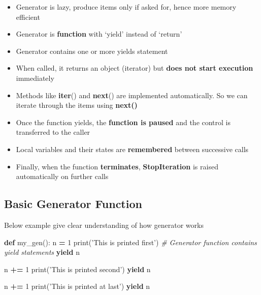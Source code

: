 \documentclass[
]{book}
\newenvironment{Shaded}{\begin{snugshade}}{\end{snugshade}}
\newcommand{\BuiltInTok}[1]{#1}
\newcommand{\CommentTok}[1]{\textcolor[rgb]{0.37,0.37,0.37}{\textit{#1}}}
\newcommand{\ControlFlowTok}[1]{\textcolor[rgb]{0.27,0.27,0.27}{\textbf{#1}}}
\newcommand{\DecValTok}[1]{\textcolor[rgb]{0.06,0.06,0.06}{#1}}
\newcommand{\KeywordTok}[1]{\textcolor[rgb]{0.27,0.27,0.27}{\textbf{#1}}}
\newcommand{\NormalTok}[1]{#1}
\newcommand{\OperatorTok}[1]{\textcolor[rgb]{0.43,0.43,0.43}{\textbf{#1}}}
\newcommand{\StringTok}[1]{\textcolor[rgb]{0.5,0.5,0.5}{#1}}
\providecommand{\tightlist}{%
  \setlength{\itemsep}{0pt}\setlength{\parskip}{0pt}}
\begin{document}
\begin{itemize}
\tightlist
\item
  Generator is lazy, produce items only if asked for, hence more memory efficient
\item
  Generator is \textbf{function} with `yield' instead of `return'\\
\item
  Generator contains one or more yields statement\\
\item
  When called, it returns an object (iterator) but \textbf{does not start execution} immediately\\
\item
  Methods like \textbf{iter}() and \textbf{next}() are implemented automatically. So we can iterate through the items using \textbf{next()}\\
\item
  Once the function yields, the \textbf{function is paused} and the control is transferred to the caller\\
\item
  Local variables and their states are \textbf{remembered} between successive calls\\
\item
  Finally, when the function \textbf{terminates}, \textbf{StopIteration} is raised automatically on further calls
\end{itemize}

\hypertarget{basic-generator-function}{%
\subsection{Basic Generator Function}\label{basic-generator-function}}

Below example give clear understanding of how generator works

\begin{Shaded}
\begin{Highlighting}[]
\KeywordTok{def}\NormalTok{ my_gen():}
\NormalTok{    n }\OperatorTok{=} \DecValTok{1}
    \BuiltInTok{print}\NormalTok{(}\StringTok{'This is printed first'}\NormalTok{)}
    \CommentTok{# Generator function contains yield statements}
    \ControlFlowTok{yield}\NormalTok{ n}

\NormalTok{    n }\OperatorTok{+=} \DecValTok{1}
    \BuiltInTok{print}\NormalTok{(}\StringTok{'This is printed second'}\NormalTok{)}
    \ControlFlowTok{yield}\NormalTok{ n}

\NormalTok{    n }\OperatorTok{+=} \DecValTok{1}
    \BuiltInTok{print}\NormalTok{(}\StringTok{'This is printed at last'}\NormalTok{)}
    \ControlFlowTok{yield}\NormalTok{ n}
\end{Highlighting}
\end{Shaded}
\end{document}
